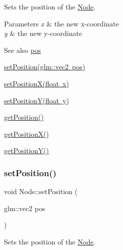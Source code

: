Sets the position of the \mbox{\hyperlink{classsage_1_1Node}{Node}}. 


\begin{DoxyParams}{Parameters}
{\em x} & the new x-\/coordinate \\
\hline
{\em y} & the new y-\/coordinate \\
\hline
\end{DoxyParams}
\begin{DoxySeeAlso}{See also}
\mbox{\hyperlink{classsage_1_1Node_a7e0ae6eeb84fae60e54e6685c982b0b2}{pos}} 

\mbox{\hyperlink{classsage_1_1Node_ae2731cefe38e706c2bf21afae6da18b3}{set\+Position(glm\+::vec2 pos)}} 

\mbox{\hyperlink{classsage_1_1Node_ae1dfc73d6122a95778d5d9db3d1fd913}{set\+Position\+X(float x)}} 

\mbox{\hyperlink{classsage_1_1Node_a5c97d36655f0daa71a5f6c715d2b0470}{set\+Position\+Y(float y)}} 

\mbox{\hyperlink{classsage_1_1Node_a67eb5862f4da3cc4b2219a7e555a5678}{get\+Position()}} 

\mbox{\hyperlink{classsage_1_1Node_a17e92da5beaeb4b299c4e93729a22b1a}{get\+Position\+X()}} 

\mbox{\hyperlink{classsage_1_1Node_a26337a40b7da400233451b71e85759cc}{get\+Position\+Y()}} 
\end{DoxySeeAlso}
\mbox{\label{classsage_1_1Node_ae2731cefe38e706c2bf21afae6da18b3}} 
\subsubsection{\texorpdfstring{setPosition()}{setPosition()}\hspace{0.1cm}{\footnotesize\ttfamily [2/2]}}
{\footnotesize\ttfamily void Node\+::set\+Position (\begin{DoxyParamCaption}\item[{glm\+::vec2}]{pos }\end{DoxyParamCaption})}



Sets the position of the \mbox{\hyperlink{classsage_1_1Node}{Node}}. 


